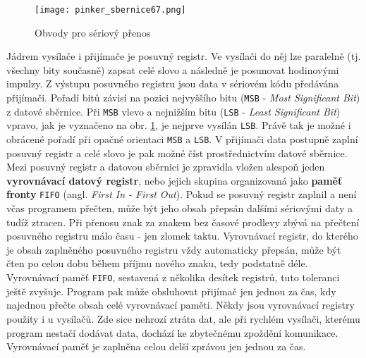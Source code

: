       \begin{figure}[ht!] %
        \centering
        \texttt{[image: pinker\_sbernice67.png]}
        \caption{Obvody pro sériový přenos}
        \label{MIT:fig_sbernice67}
      \end{figure}
      
      Jádrem vysílače i přijímače je posuvný registr. Ve vysílači do něj lze paralelně (tj. všechny
      bity současně) zapsat celé slovo a následně je posunovat hodinovými impulzy. Z výstupu
      posuvného registru jsou data v sériovém kódu předávána přijímači. Pořadí bitů závisí na pozici
      nejvyššího bitu (\texttt{MSB} - \emph{Most Significant Bit}) z datové sběrnice. Při
      \texttt{MSB} vlevo a nejnižším bitu  (\texttt{LSB} - \emph{Least Significant Bit}) vpravo, jak
      je vyznačeno na obr. \ref{MIT:fig_sbernice67}, je nejprve vysílán \texttt{LSB}. Právě tak je
      možné i obrácené pořadí při opačné orientaci \texttt{MSB} a \texttt{LSB}. V přijímači data
      postupně zaplní posuvný registr a celé slovo je pak možné číst prostřednictvím datové
      sběrnice. Mezi posuvný registr a datovou sběrnici je zpravidla vložen alespoň jeden
      \textbf{vyrovnávací datový registr}, nebo jejich skupina organizovaná jako \textbf{paměť
      fronty} \texttt{FIFO} (angl. \emph{First In - First Out}). Pokud se posuvný registr zaplnil a
      není včas programem přečten, může být jeho obsah přepsán dalšími sériovými daty a tudíž
      ztracen. Při přenosu znak za znakem bez časové prodlevy zbývá na přečtení posuvného registru
      málo času - jen zlomek taktu. Vyrovnávací registr, do kterého je obsah zaplněného posuvného
      registru vždy automaticky přepsán, může být čten po celou dobu během příjmu nového znaku, tedy
      podstatně déle. Vyrovnávací paměť \texttt{FIFO}, sestavená z několika desítek registrů, tuto
      toleranci ještě zvyšuje. Program pak může obsluhovat přijímač jen jednou za čas, kdy najednou
      přečte obsah celé vyrovnávací paměti. Někdy jsou vyrovnávací registry použity i u vysílačů.
      Zde sice nehrozí ztráta dat, ale při rychlém vysílači, kterému program nestačí dodávat data,
      dochází ke zbytečnému zpoždění komunikace. Vyrovnávací paměť je zaplněna celou delší zprávou
      jen jednou za čas.
      
